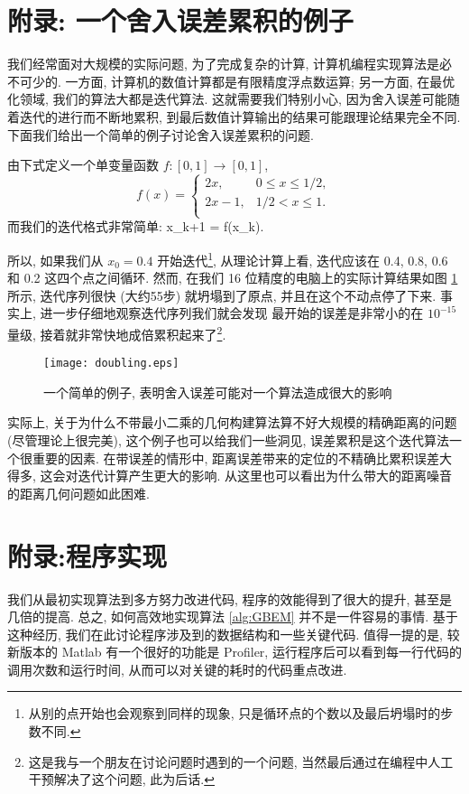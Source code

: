 \documentclass{CASthesis_zzk}
\begin{document}
\section{附录: 一个舍入误差累积的例子}
\label{sec:ErrExample}
我们经常面对大规模的实际问题, 为了完成复杂的计算, 
计算机编程实现算法是必不可少的.
一方面, 计算机的数值计算都是有限精度浮点数运算;
另一方面, 在最优化领域, 我们的算法大都是迭代算法.
这就需要我们特别小心, 因为舍入误差可能随着迭代的进行而不断地累积,
到最后数值计算输出的结果可能跟理论结果完全不同.
下面我们给出一个简单的例子讨论舍入误差累积的问题.

由下式定义一个单变量函数 $f: [0,1]\rightarrow [0,1]$,
\begin{equation}
  f(x)=
  \left\{
    \begin{array}{ll}
      2x,  & 0\leq x \leq 1/2, \\
      2x-1, & 1/2<x\leq 1. \\
    \end{array}
  \right.
\end{equation}
而我们的迭代格式非常简单:
\be x_{k+1} = f(x_k). \ee

所以, 如果我们从 $x_0 = 0.4$ 开始迭代\footnote{从别的点开始也会观察到同样的现象, 只是循环点的个数以及最后坍塌时的步数不同.}, 
从理论计算上看, 迭代应该在 0.4, 0.8, 0.6 和 0.2 这四个点之间循环. 
然而, 在我们 16 位精度的电脑上的实际计算结果如图 \ref{fig:doubling} 所示, 
迭代序列很快 (大约55步) 就坍塌到了原点, 并且在这个不动点停了下来.
事实上, 进一步仔细地观察迭代序列我们就会发现
最开始的误差是非常小的\pozhe 在 $10^{-15}$ 量级, 
接着就非常快地成倍累积起来了\footnote{这是我与一个朋友在讨论问题时遇到的一个问题, 当然最后通过在编程中人工干预解决了这个问题, 此为后话.}.

\begin{figure}[htp]
  \centering
  \texttt{[image: doubling.eps]}\\
  \caption{一个简单的例子, 表明舍入误差可能对一个算法造成很大的影响}
  \label{fig:doubling}
\end{figure}

实际上, 关于为什么不带最小二乘的几何构建算法算不好大规模的精确距离的问题 
(尽管理论上很完美),
这个例子也可以给我们一些洞见, 误差累积是这个迭代算法一个很重要的因素.
在带误差的情形中, 距离误差带来的定位的不精确比累积误差大得多,
这会对迭代计算产生更大的影响. 
从这里也可以看出为什么带大的距离噪音的距离几何问题如此困难.


\section{附录:程序实现}
\label{sec:CodeWrite}
我们从最初实现算法到多方努力改进代码, 程序的效能得到了很大的提升,
甚至是几倍的提高.
总之, 如何高效地实现算法 \ref{alg:GBEM} 并不是一件容易的事情.
基于这种经历, 我们在此讨论程序涉及到的数据结构和一些关键代码.
值得一提的是, 较新版本的 Matlab 有一个很好的功能是 Profiler,
运行程序后可以看到每一行代码的调用次数和运行时间,
从而可以对关键的耗时的代码重点改进.
\end{document}
